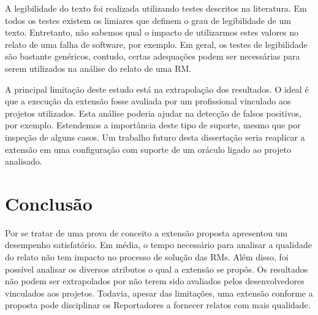 A legibilidade do texto foi realizada utilizando testes descritos na literatura.
Em todos os testes existem os limiares que definem o grau de legibilidade de um
texto. Entretanto, não sabemos qual o impacto de utilizarmos estes valores no
relato de uma falha de software, por exemplo. Em geral, os testes de
legibilidade são bastante genéricos, contudo, certas adequações podem ser
necessárias para serem utilizados na análise do relato de uma RM\@.

A principal limitação deste estudo está na extrapolação dos resultados. O ideal
é que a execução da extensão fosse avaliada por um profissional vinculado aos
projetos utilizados. Esta análise poderia ajudar na detecção de falsos
positivos, por exemplo. Estendemos a importância deste tipo de suporte, mesmo
que por inspeção de alguns casos. Um trabalho futuro desta dissertação seria
reaplicar a extensão em uma configuração com suporte de um oráculo ligado ao
projeto analisado.

\section{Conclusão}
\label{sec:implementacao_extensao_conclusao}

Por se tratar de uma prova de conceito a extensão proposta apresentou um
desempenho satisfatório. Em média, o tempo necessário para analisar a qualidade
do relato não tem impacto no processo de solução das RMs. Além disso, foi
possível analisar os diversos atributos o qual a extensão se propôs. Os
resultados não podem ser extrapolados por não terem sido avaliados pelos
desenvolvedores vinculados aos projetos. Todavia, apesar das limitações, uma
extensão conforme a proposta pode disciplinar os Reportadores a fornecer
relatos com mais qualidade.

